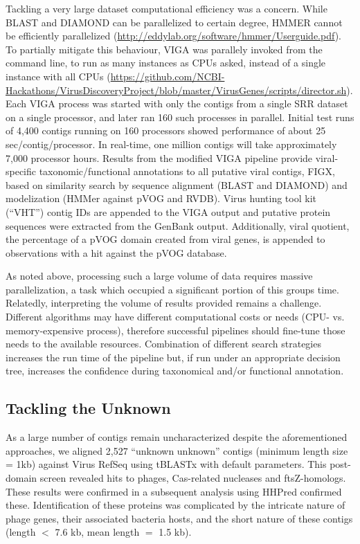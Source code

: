   Tackling a very large dataset computational efficiency was a concern. While
  BLAST and DIAMOND can be parallelized to certain degree, HMMER cannot be
  efficiently parallelized
  (\url{http://eddylab.org/software/hmmer/Userguide.pdf}). To partially
  mitigate this behaviour, VIGA was parallely invoked from the command line, to
  run as many instances as CPUs asked, instead of a single instance with all
  CPUs
  (\url{https://github.com/NCBI-Hackathons/VirusDiscoveryProject/blob/master/VirusGenes/scripts/director.sh}).
  Each VIGA process was started with only the contigs from a single SRR dataset
  on a single processor, and later ran 160 such processes in parallel. Initial
  test runs of 4,400 contigs running on 160 processors showed performance of
  about 25 sec/contig/processor. In real-time, one million contigs will take
  approximately 7,000 processor hours. Results from the modified VIGA pipeline
  provide viral-specific taxonomic/functional annotations to all putative viral
  contigs, FIGX, based on similarity search by sequence alignment (BLAST and
  DIAMOND) and modelization (HMMer against pVOG and RVDB). Virus hunting tool
  kit (“VHT”) contig IDs are appended to the VIGA output and putative protein
  sequences were extracted from the GenBank output. Additionally, viral
  quotient, the percentage of a pVOG domain created from viral genes, is
  appended to observations with a hit against the pVOG database.

  As noted above, processing such a large volume of data requires massive
  parallelization, a task which occupied a significant portion of this groups
  time. Relatedly, interpreting the volume of results provided remains a
  challenge. Different algorithms may have different computational costs or
  needs (CPU- vs. memory-expensive process), therefore successful pipelines
  should fine-tune those needs to the available resources. Combination of
  different search strategies increases the run time of the pipeline but, if
  run under an appropriate decision tree, increases the confidence during
  taxonomical and/or functional annotation.

  \subsection{Tackling the Unknown}
  As a large number of contigs remain uncharacterized despite the
  aforementioned approaches, we  aligned 2,527 “unknown unknown” contigs
  (minimum length size = 1kb) against Virus RefSeq using tBLASTx
  \cite{Camacho2009} with default parameters. This post-domain screen revealed
  hits to phages, Cas-related nucleases and ftsZ-homologs. These results were
  confirmed in a subsequent analysis using HHPred \cite{Hildebrand2009}
  confirmed these. Identification of these proteins was complicated by the
  intricate nature of phage genes, their associated bacteria hosts, and the
  short nature of these contigs (length $<$ 7.6 kb, mean length $=$ 1.5 kb).

